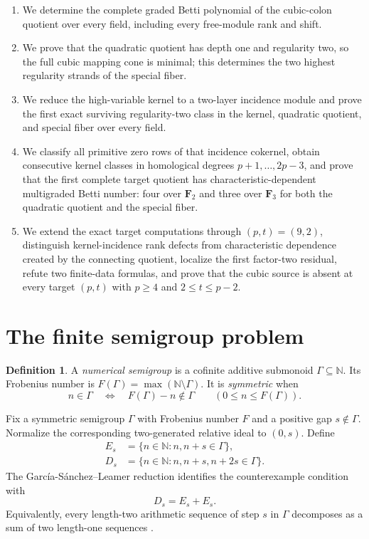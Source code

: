 \documentclass[11pt]{article}
\theoremstyle{definition}
\newtheorem{definition}[theorem]{Definition}
\theoremstyle{remark}
\newcommand{\N}{\mathbb{N}}
\begin{document}
\begin{enumerate}
  unit filler block, thereby determining the complete third homological row over every field.
  \item We determine the complete graded Betti polynomial of the cubic-colon quotient over every
  field, including every free-module rank and shift.
  \item We prove that the quadratic quotient has depth one and regularity two, so the full cubic
  mapping cone is minimal; this determines the two highest regularity strands of the special fiber.
  \item We reduce the high-variable kernel to a two-layer incidence module and prove the first
  exact surviving regularity-two class in the kernel, quadratic quotient, and special fiber over
  every field.
  \item We classify all primitive zero rows of that incidence cokernel, obtain consecutive kernel
  classes in homological degrees $p+1,\ldots,2p-3$, and prove that the first complete target
  quotient has characteristic-dependent multigraded Betti number: four over $\mathbf F_2$ and
  three over $\mathbf F_3$ for both the quadratic quotient and the special fiber.
  \item We extend the exact target computations through $(p,t)=(9,2)$, distinguish kernel-incidence
  rank defects from characteristic dependence created by the connecting quotient, localize the
  first factor-two residual, refute two finite-data formulas, and prove that the cubic source is
  absent at every target $(p,t)$ with $p\ge4$ and $2\le t\le p-2$.
\end{enumerate}

\section{The finite semigroup problem}

\begin{definition}
A \emph{numerical semigroup} is a cofinite additive submonoid $\Gamma\subseteq\N$. Its Frobenius
number is $F(\Gamma)=\max(\N\setminus\Gamma)$. It is \emph{symmetric} when
\[
  n\in\Gamma \quad\Longleftrightarrow\quad F(\Gamma)-n\notin\Gamma
  \qquad (0\le n\le F(\Gamma)).
\]
\end{definition}

Fix a symmetric semigroup $\Gamma$ with Frobenius number $F$ and a positive gap
$s\notin\Gamma$. Normalize the corresponding two-generated relative ideal to $(0,s)$. Define
\begin{align*}
E_s &= \{n\in\N:n,n+s\in\Gamma\},\\
D_s &= \{n\in\N:n,n+s,n+2s\in\Gamma\}.
\end{align*}
The Garc\'ia-S\'anchez--Leamer reduction identifies the counterexample condition with
\begin{equation}\label{eq:rigidity}
  D_s=E_s+E_s.
\end{equation}
Equivalently, every length-two arithmetic sequence of step $s$ in $\Gamma$ decomposes as a sum of
two length-one sequences \cite{GarciaSanchezLeamer2013,Landeros2024}.
\end{document}
